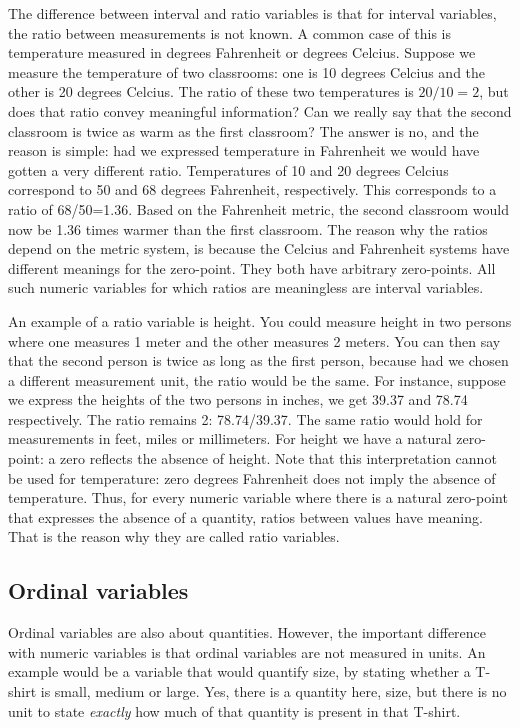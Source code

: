 \documentclass[]{book}\usepackage[]{graphicx}\usepackage[]{color}
\begin{document}
The difference between interval and ratio variables is that for interval variables, the ratio between measurements is not known. A common case of this is temperature measured in degrees Fahrenheit or degrees Celcius. Suppose we measure the temperature of two classrooms: one is 10 degrees Celcius and the other is 20 degrees Celcius. The ratio of these two temperatures is $20/10=2$, but does that ratio convey meaningful information? Can we really say that the second classroom is twice as warm as the first classroom? The answer is no, and the reason is simple: had we expressed temperature in Fahrenheit we would have gotten a very different ratio. Temperatures of 10 and 20 degrees Celcius correspond to 50 and 68 degrees Fahrenheit, respectively. This corresponds to a ratio of 68/50=1.36. Based on the Fahrenheit metric, the second classroom would now be 1.36 times warmer than the first classroom. The reason why the ratios depend on the metric system, is because the Celcius and Fahrenheit systems have different meanings for the zero-point. They both have arbitrary zero-points. All such numeric variables for which ratios are meaningless are interval variables.

An example of a ratio variable is height. You could measure height in two persons where one measures 1 meter and the other measures 2 meters. You can then say that the second person is twice as long as the first person, because had we chosen a different measurement unit, the ratio would be the same. For instance, suppose we express the heights of the two persons in inches, we get 39.37 and 78.74 respectively. The ratio remains 2: 78.74/39.37. The same ratio would hold for measurements in feet, miles or millimeters. For height we have a natural zero-point: a zero reflects the absence of height. Note that this interpretation cannot be used for temperature: zero degrees Fahrenheit does not imply the absence of temperature. Thus, for every numeric variable where there is a natural zero-point that expresses the absence of a quantity, ratios between values have meaning. That is the reason why they are called ratio variables.



\subsection{Ordinal variables}

Ordinal variables are also about quantities. However, the important difference with numeric variables is that ordinal variables are not measured in units. An example would be a variable that would quantify size, by stating whether a T-shirt is small, medium or large. Yes, there is a quantity here, size, but there is no unit to state \textit{exactly} how much of that quantity is present in that T-shirt.
\end{document}
